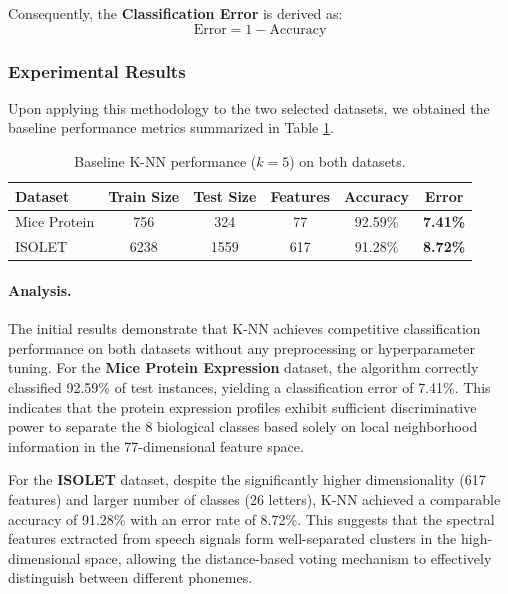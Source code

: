 \documentclass[12pt]{article}
\begin{document}
Consequently, the \textbf{Classification Error} is derived as:
\begin{equation}
    \text{Error} = 1 - \text{Accuracy}
\end{equation}

\subsubsection{Experimental Results}
Upon applying this methodology to the two selected datasets, we obtained the baseline performance metrics summarized in Table \ref{tab:knn_baseline}.

\begin{table}[H]
\centering
\begin{tabular}{lccccc}
\toprule
\textbf{Dataset} & \textbf{Train Size} & \textbf{Test Size} & \textbf{Features} & \textbf{Accuracy} & \textbf{Error} \\
\midrule
Mice Protein & 756 & 324 & 77 & 92.59\% & \textbf{7.41\%} \\
ISOLET & 6238 & 1559 & 617 & 91.28\% & \textbf{8.72\%} \\
\bottomrule
\end{tabular}
\caption{Baseline K-NN performance ($k=5$) on both datasets.}
\label{tab:knn_baseline}
\end{table}

\paragraph{Analysis.} The initial results demonstrate that K-NN achieves competitive classification performance on both datasets without any preprocessing or hyperparameter tuning. For the \textbf{Mice Protein Expression} dataset, the algorithm correctly classified 92.59\% of test instances, yielding a classification error of 7.41\%. This indicates that the protein expression profiles exhibit sufficient discriminative power to separate the 8 biological classes based solely on local neighborhood information in the 77-dimensional feature space.

For the \textbf{ISOLET} dataset, despite the significantly higher dimensionality (617 features) and larger number of classes (26 letters), K-NN achieved a comparable accuracy of 91.28\% with an error rate of 8.72\%. This suggests that the spectral features extracted from speech signals form well-separated clusters in the high-dimensional space, allowing the distance-based voting mechanism to effectively distinguish between different phonemes.
\end{document}
